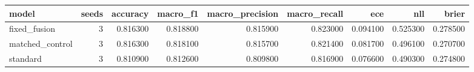 \begin{tabular}{lrrrrrrrr}
\toprule
model & seeds & accuracy & macro\_f1 & macro\_precision & macro\_recall & ece & nll & brier \\
\midrule
fixed\_fusion & 3 & 0.816300 & 0.818800 & 0.815900 & 0.823000 & 0.094100 & 0.525300 & 0.278500 \\
matched\_control & 3 & 0.816300 & 0.818100 & 0.815700 & 0.821400 & 0.081700 & 0.496100 & 0.270700 \\
standard & 3 & 0.810900 & 0.812600 & 0.809800 & 0.816900 & 0.076600 & 0.490300 & 0.274800 \\
\bottomrule
\end{tabular}
